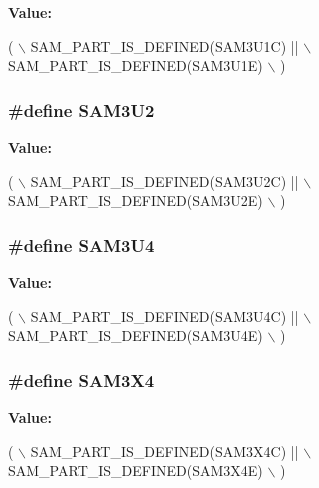 {\bfseries Value\-:}
\begin{DoxyCode}
( \(\backslash\)
        SAM\_PART\_IS\_DEFINED(SAM3U1C) || \(\backslash\)
        SAM\_PART\_IS\_DEFINED(SAM3U1E) \(\backslash\)
        )
\end{DoxyCode}
\hypertarget{group__sam__part__macros__group_ga0feb884f39921517436f269c86914cb0}{
\subsubsection[{S\-A\-M3\-U2}]{\setlength{\rightskip}{0pt plus 5cm}\#define S\-A\-M3\-U2}}\label{group__sam__part__macros__group_ga0feb884f39921517436f269c86914cb0}
{\bfseries Value\-:}
\begin{DoxyCode}
( \(\backslash\)
        SAM\_PART\_IS\_DEFINED(SAM3U2C) || \(\backslash\)
        SAM\_PART\_IS\_DEFINED(SAM3U2E) \(\backslash\)
        )
\end{DoxyCode}
\hypertarget{group__sam__part__macros__group_ga2af1cda107cbae1f393bce7a6c659a98}{
\subsubsection[{S\-A\-M3\-U4}]{\setlength{\rightskip}{0pt plus 5cm}\#define S\-A\-M3\-U4}}\label{group__sam__part__macros__group_ga2af1cda107cbae1f393bce7a6c659a98}
{\bfseries Value\-:}
\begin{DoxyCode}
( \(\backslash\)
        SAM\_PART\_IS\_DEFINED(SAM3U4C) || \(\backslash\)
        SAM\_PART\_IS\_DEFINED(SAM3U4E) \(\backslash\)
        )
\end{DoxyCode}
\hypertarget{group__sam__part__macros__group_ga735357bdbbd05356a7829e517fb4203f}{
\subsubsection[{S\-A\-M3\-X4}]{\setlength{\rightskip}{0pt plus 5cm}\#define S\-A\-M3\-X4}}\label{group__sam__part__macros__group_ga735357bdbbd05356a7829e517fb4203f}
{\bfseries Value\-:}
\begin{DoxyCode}
( \(\backslash\)
        SAM\_PART\_IS\_DEFINED(SAM3X4C) || \(\backslash\)
        SAM\_PART\_IS\_DEFINED(SAM3X4E) \(\backslash\)
        )
\end{DoxyCode}
